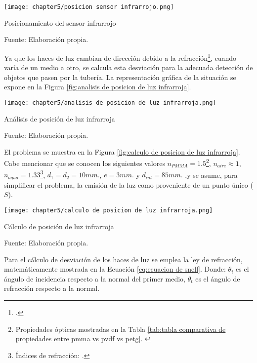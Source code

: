 \begin{myfigure}[H]
	\centering
	\texttt{[image: chapter5/posicion sensor infrarrojo.png]}
	\caption{Posicionamiento del sensor infrarrojo}
	\begin{myflushleftportland}
		Fuente: Elaboración propia.
	\end{myflushleftportland}
	\label{fig:posicion sensor infrarrojo}
\end{myfigure}

Ya que los haces de luz cambian de dirección debido a la refracción\footnote{\cite{Hecht2017}.}, cuando varía de un medio a otro, se calcula esta desviación para la adecuada detección de objetos que pasen por la tubería. La representación gráfica de la situación se expone en la Figura \ref{fig:analisis de posicion de luz infrarroja}.

\begin{myfigure}[H]
	\centering
	\texttt{[image: chapter5/analisis de posicion de luz infrarroja.png]}
	\caption{Análisis de posición de luz infrarroja}
	\begin{myflushleftportland}
		Fuente: Elaboración propia.
	\end{myflushleftportland}
	\label{fig:analisis de posicion de luz infrarroja}
\end{myfigure}

El problema se muestra en la Figura \ref{fig:calculo de posicion de luz infrarroja}. Cabe mencionar que se conocen los siguientes valores $n_{PMMA}=1.5$\footnote{Propiedades ópticas mostradas en la Tabla \ref{tab:tabla comparativa de propiedades entre pmma vs pvdf vs petg}. \cite{Berins1991}}, $n_{aire}\approx1$, $n_{agua}=1.33$\footnote{Índices de refracción: \cite{Hecht2017}.}, $d_{1}=d_{2}=10 mm.$, $e=3 mm.$ y $d_{int}=85 mm.$ ,y se asume, para simplificar el problema, la emisión de la luz como proveniente de un punto único ($S$).

\begin{myfigure}[H]
	\centering
	\texttt{[image: chapter5/calculo de posicion de luz infrarroja.png]}
	\caption{Cálculo de posición de luz infrarroja}
	\begin{myflushleftportland}
		Fuente: Elaboración propia.
	\end{myflushleftportland}
	\label{fig:calculo de posicion de luz infrarroja}
\end{myfigure}

Para el cálculo de desviación de los haces de luz se emplea la ley de refracción, matemáticamente mostrada en la Ecuación \ref{eq:ecuacion de snell}. Donde: $\theta_{i}$ es el ángulo de incidencia respecto a la normal del primer medio, $\theta_{t}$ es el ángulo de refracción respecto a la normal.

